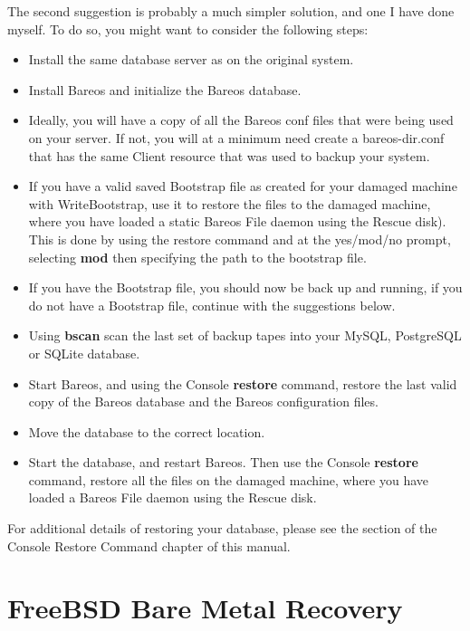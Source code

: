 The second suggestion is probably a much simpler solution, and one I have done
myself. To do so, you might want to consider the following steps:

\begin{itemize}
\item Install the same database server as on the original system.
\item Install Bareos and initialize the Bareos database.
\item Ideally, you will have a copy of all the Bareos conf files that
   were being used on your server. If not, you will at a minimum need
   create a bareos-dir.conf that has the same Client resource that
   was used to backup your system.
\item If you have a valid saved Bootstrap file as created for your damaged
   machine with WriteBootstrap, use it to restore the files to the damaged
   machine, where you have loaded a static Bareos File daemon using the
   Rescue disk).  This is done by using the restore command and at
   the yes/mod/no prompt, selecting {\bf mod} then specifying the path to
   the bootstrap file.
\item If you have the Bootstrap file, you should now be back up and  running,
   if you do not have a Bootstrap file, continue with the  suggestions below.
\item Using {\bf bscan} scan the last set of backup tapes into your  MySQL,
   PostgreSQL or SQLite database.
\item Start Bareos, and using the Console {\bf restore} command,  restore the
   last valid copy of the Bareos database and the Bareos configuration
   files.
\item Move the database to the correct location.
\item Start the database, and restart Bareos. Then use the Console {\bf
   restore} command, restore all the files  on the damaged machine, where you
   have loaded a Bareos File  daemon using the Rescue disk.
\end{itemize}

For additional details of restoring your database, please see the
 section
of the Console Restore Command chapter of this manual.



\label{FreeBSD1}
\section{FreeBSD Bare Metal Recovery}

